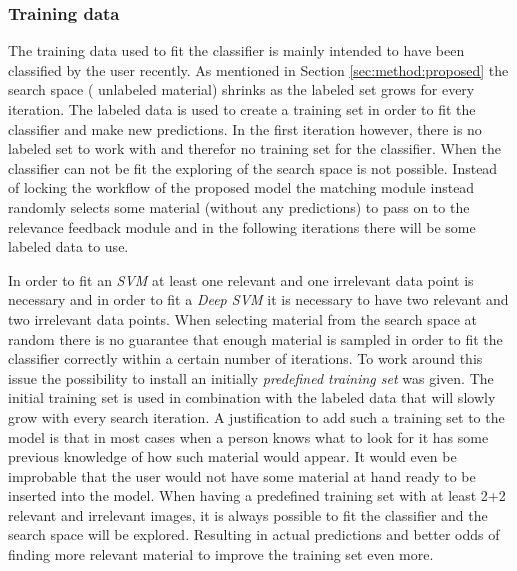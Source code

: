 \subsubsection{Training data}
\label{sec:method:proposed:matching:training}
The training data used to fit the classifier is mainly intended to have been classified by the user recently. As mentioned in Section \ref{sec:method:proposed} the search space ( unlabeled material) shrinks as the labeled set grows for every iteration. The labeled data is used to create a training set in order to fit the classifier and make new predictions. 
In the first iteration however, there is no labeled set to work with and therefor no training set for the classifier. When the classifier can not be fit the exploring of the search space is not possible. Instead of locking the workflow of the proposed model the matching module instead randomly selects some material (without any predictions) to pass on to the relevance feedback module and in the following iterations there will be some labeled data to use.

In order to fit an \emph{SVM} at least one relevant and one irrelevant data point is necessary and in order to fit a \emph{Deep SVM} it is necessary to have two relevant and two irrelevant data points. When selecting material from the search space at random there is no guarantee that enough material is sampled in order to fit the classifier correctly within a certain number of iterations. 
To work around this issue the possibility to install an initially \emph{predefined training set} was given. The initial training set is used in combination with the labeled data that will slowly grow with every search iteration. A justification to add such a training set to the model is that in most cases when a person knows what to look for it has some previous knowledge of how such material would appear. It would even be improbable that the user would not have some material at hand ready to be inserted into the model. When having a predefined training set with at least 2+2 relevant and irrelevant images, it is always possible to fit the classifier and the search space will be explored. Resulting in actual predictions and better odds of finding more relevant material to improve the training set even more.

